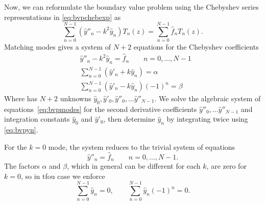 \documentclass[ twoside,openright,titlepage,numbers=noenddot,%
headinclude,footinclude,cleardoublepage=empty,abstract=on,
BCOR=5mm,paper=a4,fontsize=11pt, dvipsnames
]{scrreprt}
\newcommand{\fou}[1]{\widehat{#1}}
\begin{document}
Now, we can reformulate the boundary value problem using the Chebyshev series representations in \eqref{eq:bvpchebexp} as
\begin{equation}
\label{eq:bvpn0}
\sum_{n=0}^{N-1} (\fou{y}''_n-k^2\fou{y}_n)T_n(z) = \sum_{n=0}^{N-1}\fou{f}_n T_n(z).
\end{equation}
Matching modes gives a system of $N+2$ equations for the Chebyshev coefficients
\begin{equation}
\label{eq:bvpmodes}
\begin{aligned}
&\fou{y}''_n-k^2\fou{y}_n=\fou{f}_n \qquad n=0, \dots, N-1\\
&\sum_{n=0}^{N-1} (\fou{y}'_n+k\fou{y}_n) = \alpha\\
&\sum_{n=0}^{N-1} (\fou{y}'_n-k\fou{y}_n) (-1)^n = \beta
\end{aligned}
\end{equation}
Where has $N+2$ unknowns $\fou{y}_0, \fou{y}'_0, \fou{y}''_0, \dots \fou{y}''_{N-1}$. We solve the algebraic system of equations\ \eqref{eq:bvpmodes} for the second derivative coefficients $\fou{y}''_0, \dots \fou{y}''_{N-1}$ and integration constants $\fou{y}_0$ and $\fou{y}'_0$, then determine $\fou{y}_n$ by integrating twice using \eqref{eq:bvpyn}.

For the $k=0$ mode, the system reduces to the trivial system of equations
\begin{equation}
\label{eq:bvpmodes0}
\fou{y}''_n=\fou{f}_n \qquad n=0, \dots, N-1.
\end{equation}
The factors $\alpha$ and $\beta$, which in general can be different for each $k$, are zero for $k=0$, so in tfou case we enforce
\begin{equation}
\label{eq:bvpBCs0}
\sum_{n=0}^{N-1} \fou{y}_n = 0, \qquad \sum_{n=0}^{N-1} \fou{y}_n (-1)^n = 0.
\end{equation}
\end{document}
